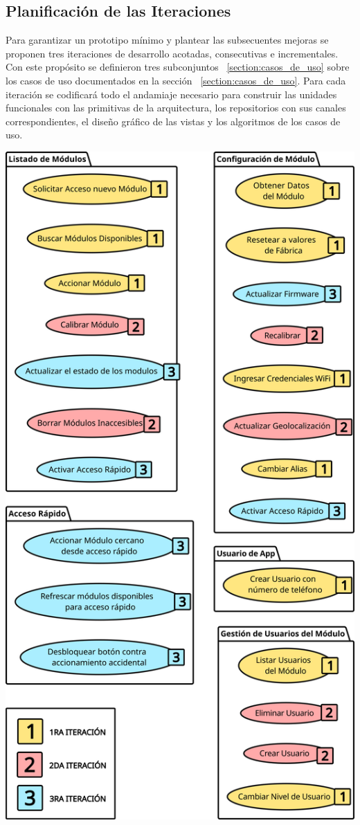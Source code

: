 
\subsection{Planificación de las Iteraciones}

Para garantizar un prototipo mínimo y plantear las subsecuentes mejoras se proponen tres iteraciones de desarrollo acotadas, consecutivas e incrementales. Con este propósito se definieron tres subconjuntos ~\ref{section:casos_de_uso} sobre los casos de uso documentados en la sección ~\ref{section:casos_de_uso}. Para cada iteración se codificará todo el andamiaje necesario para construir las unidades funcionales con las primitivas de la arquitectura, los repositorios con sus canales correspondientes, el diseño gráfico de las vistas y los algoritmos de los casos de uso.
\pagebreak
\begin{multicols}{2}
	\begin{Figure}%
		\centering
		\includegraphics[width=\linewidth]{Figures/design/USE_todos_iterac.png}

\end{Figure}
\end{multicols}
